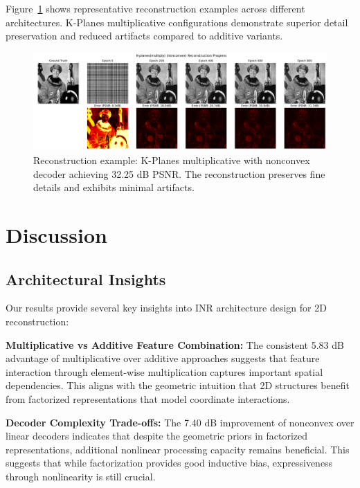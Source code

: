 \documentclass{article}
\begin{document}
Figure~\ref{fig:reconstruction_examples} shows representative reconstruction examples across different architectures. K-Planes multiplicative configurations demonstrate superior detail preservation and reduced artifacts compared to additive variants.

\begin{figure}[t]
\centering
\includegraphics[width=0.8\linewidth]{experiments/exp001_architecture_comparison/full_results/visualizations/K-planesmultiply_nonconvex_seed0.png}
\caption{Reconstruction example: K-Planes multiplicative with nonconvex decoder achieving 32.25 dB PSNR. The reconstruction preserves fine details and exhibits minimal artifacts.}
\label{fig:reconstruction_examples}
\end{figure}

\section{Discussion}

\subsection{Architectural Insights}

Our results provide several key insights into INR architecture design for 2D reconstruction:

\textbf{Multiplicative vs Additive Feature Combination:} The consistent 5.83 dB advantage of multiplicative over additive approaches suggests that feature interaction through element-wise multiplication captures important spatial dependencies. This aligns with the geometric intuition that 2D structures benefit from factorized representations that model coordinate interactions.

\textbf{Decoder Complexity Trade-offs:} The 7.40 dB improvement of nonconvex over linear decoders indicates that despite the geometric priors in factorized representations, additional nonlinear processing capacity remains beneficial. This suggests that while factorization provides good inductive bias, expressiveness through nonlinearity is still crucial.
\end{document}
